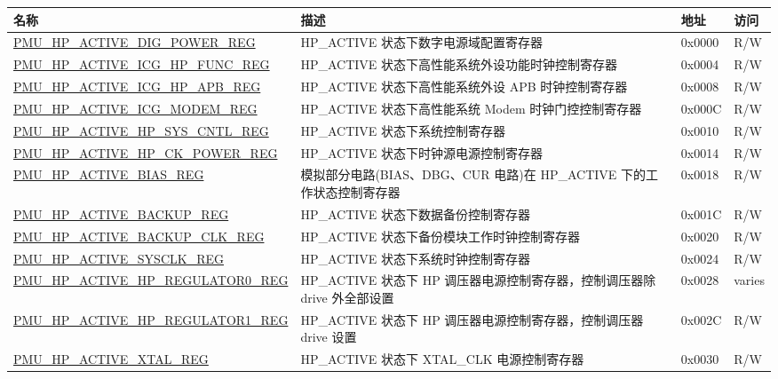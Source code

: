 \begin{longtable}{ | p{6.5cm} | p{8cm} | p{1.3cm} | p{1cm} | }
\hline\rowcolor{lightgray}
\textbf{名称} & \textbf{描述} &  \textbf{地址} & \textbf{访问} \\ \hline
\endhead
\hyperref[regdesc:PMUHPACTIVEDIGPOWERREG]{PMU\_HP\_ACTIVE\_DIG\_POWER\_REG} & HP\_ACTIVE 状态下数字电源域配置寄存器 & 0x0000 & R/W \\ \hline
\hyperref[regdesc:PMUHPACTIVEICGHPFUNCREG]{PMU\_HP\_ACTIVE\_ICG\_HP\_FUNC\_REG} & HP\_ACTIVE 状态下高性能系统外设功能时钟控制寄存器 & 0x0004 & R/W \\ \hline
\hyperref[regdesc:PMUHPACTIVEICGHPAPBREG]{PMU\_HP\_ACTIVE\_ICG\_HP\_APB\_REG} & HP\_ACTIVE 状态下高性能系统外设 APB 时钟控制寄存器 & 0x0008 & R/W \\ \hline
\hyperref[regdesc:PMUHPACTIVEICGMODEMREG]{PMU\_HP\_ACTIVE\_ICG\_MODEM\_REG} & HP\_ACTIVE 状态下高性能系统 Modem 时钟门控控制寄存器 & 0x000C & R/W \\ \hline
\hyperref[regdesc:PMUHPACTIVEHPSYSCNTLREG]{PMU\_HP\_ACTIVE\_HP\_SYS\_CNTL\_REG} & HP\_ACTIVE 状态下系统控制寄存器 & 0x0010 & R/W \\ \hline
\hyperref[regdesc:PMUHPACTIVEHPCKPOWERREG]{PMU\_HP\_ACTIVE\_HP\_CK\_POWER\_REG} & HP\_ACTIVE 状态下时钟源电源控制寄存器 & 0x0014 & R/W \\ \hline
\hyperref[regdesc:PMUHPACTIVEBIASREG]{PMU\_HP\_ACTIVE\_BIAS\_REG} & 模拟部分电路(BIAS、DBG、CUR 电路)在 HP\_ACTIVE 下的工作状态控制寄存器 & 0x0018 & R/W \\ \hline
\hyperref[regdesc:PMUHPACTIVEBACKUPREG]{PMU\_HP\_ACTIVE\_BACKUP\_REG} & HP\_ACTIVE 状态下数据备份控制寄存器 & 0x001C & R/W \\ \hline
\hyperref[regdesc:PMUHPACTIVEBACKUPCLKREG]{PMU\_HP\_ACTIVE\_BACKUP\_CLK\_REG} & HP\_ACTIVE 状态下备份模块工作时钟控制寄存器 & 0x0020 & R/W \\ \hline
\hyperref[regdesc:PMUHPACTIVESYSCLKREG]{PMU\_HP\_ACTIVE\_SYSCLK\_REG} & HP\_ACTIVE 状态下系统时钟控制寄存器  & 0x0024 & R/W \\ \hline
\hyperref[regdesc:PMUHPACTIVEHPREGULATOR0REG]{PMU\_HP\_ACTIVE\_HP\_REGULATOR0\_REG} & HP\_ACTIVE 状态下 HP 调压器电源控制寄存器，控制调压器除 drive 外全部设置 & 0x0028 & varies \\ \hline
\hyperref[regdesc:PMUHPACTIVEHPREGULATOR1REG]{PMU\_HP\_ACTIVE\_HP\_REGULATOR1\_REG} & HP\_ACTIVE 状态下 HP 调压器电源控制寄存器，控制调压器 drive 设置 & 0x002C & R/W \\ \hline
\hyperref[regdesc:PMUHPACTIVEXTALREG]{PMU\_HP\_ACTIVE\_XTAL\_REG} & HP\_ACTIVE 状态下 XTAL\_CLK 电源控制寄存器 & 0x0030 & R/W \\ \hline

\end{longtable}
